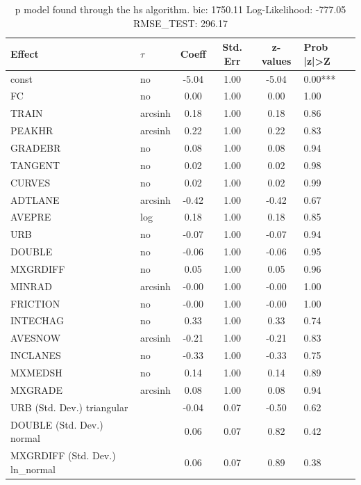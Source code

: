 \begin{table}
	\caption{p model found through the hs algorithm. bic: 1750.11 Log-Likelihood: -777.05 RMSE_TEST: 296.17}
	\begin{center}
		\begin{tabular}{|l|l|c|c|c|l|}
			\hline
			Effect & $\tau$ & Coeff & Std. Err & z-values & Prob |z|>Z \\
			\hline
			const & no & -5.04 & 1.00 & -5.04 & 0.00*** \\
			\hline
			FC & no & 0.00 & 1.00 & 0.00 & 1.00 \\
			\hline
			TRAIN & arcsinh & 0.18 & 1.00 & 0.18 & 0.86 \\
			\hline
			PEAKHR & arcsinh & 0.22 & 1.00 & 0.22 & 0.83 \\
			\hline
			GRADEBR & no & 0.08 & 1.00 & 0.08 & 0.94 \\
			\hline
			TANGENT & no & 0.02 & 1.00 & 0.02 & 0.98 \\
			\hline
			CURVES & no & 0.02 & 1.00 & 0.02 & 0.99 \\
			\hline
			ADTLANE & arcsinh & -0.42 & 1.00 & -0.42 & 0.67 \\
			\hline
			AVEPRE & log & 0.18 & 1.00 & 0.18 & 0.85 \\
			\hline
			URB & no & -0.07 & 1.00 & -0.07 & 0.94 \\
			\hline
			DOUBLE & no & -0.06 & 1.00 & -0.06 & 0.95 \\
			\hline
			MXGRDIFF & no & 0.05 & 1.00 & 0.05 & 0.96 \\
			\hline
			MINRAD & arcsinh & -0.00 & 1.00 & -0.00 & 1.00 \\
			\hline
			FRICTION & no & -0.00 & 1.00 & -0.00 & 1.00 \\
			\hline
			INTECHAG & no & 0.33 & 1.00 & 0.33 & 0.74 \\
			\hline
			AVESNOW & arcsinh & -0.21 & 1.00 & -0.21 & 0.83 \\
			\hline
			INCLANES & no & -0.33 & 1.00 & -0.33 & 0.75 \\
			\hline
			MXMEDSH & no & 0.14 & 1.00 & 0.14 & 0.89 \\
			\hline
			MXGRADE & arcsinh & 0.08 & 1.00 & 0.08 & 0.94 \\
			\hline
			URB (Std. Dev.) triangular &  & -0.04 & 0.07 & -0.50 & 0.62 \\
			\hline
			DOUBLE (Std. Dev.) normal &  & 0.06 & 0.07 & 0.82 & 0.42 \\
			\hline
			MXGRDIFF (Std. Dev.) ln_normal &  & 0.06 & 0.07 & 0.89 & 0.38 \\

\end{tabular}
\end{center}
\end{table}
